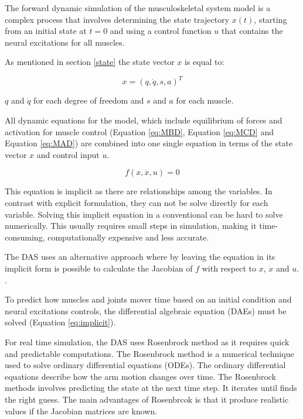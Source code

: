 The forward dynamic simulation of the musculoskeletal system model is a complex process that involves determining the state trajectory $x(t)$, starting from an initial state at $t = 0$ and using a control function $u$ that contains the neural excitations for all muscles. 

As mentioned in section \ref{state} the state vector $x$ is equal to:

\begin{equation}
    x = (q,\dot{q},s,a)^T
\end{equation}

$q$ and $\dot{q}$ for each degree of freedom and $s$ and $a$ for each muscle.

All dynamic equations for the model, which include equilibrium of forces and activation for muscle control (Equation \ref{eq:MBD}, Equation \ref{eq:MCD} and Equation \ref{eq:MAD}) are combined into one single equation in terms of the state vector $x$ and control input $u$.

\begin{equation} \label{eq:implicit}
    f(x,\dot{x},u)=0
\end{equation}

This equation is implicit as there are relationships among the variables. In contrast with explicit formulation, they can not be solve directly for each variable. Solving this implicit equation in a conventional can be hard to solve numerically. This usually requires small steps in simulation, making it time-consuming, computationally expensive and less accurate.

The DAS uses an alternative approach where by leaving the equation in its implicit form is possible to calculate the Jacobian of $f$ with respect to $x$, $\dot{x}$ and $u$. \cite{IMP}.

To predict how muscles and joints mover time based on an initial condition and neural excitations controls, the differential algebraic equation (DAEs) must be solved (Equation \ref{eq:implicit}). 

For real time simulation, the DAS uses Rosenbrock method as it requires quick and predictable computations. The Rosenbrock method is a numerical technique used to solve ordinary differential equations (ODEs). The ordinary differential equations describe how the arm motion changes over time. The Rosenbrock methods involves predicting the state at the next time step. It iterates until finds the right guess. The main advantages of Rosenbrcok is that it produce realistic values if the Jacobian matrices are known.

